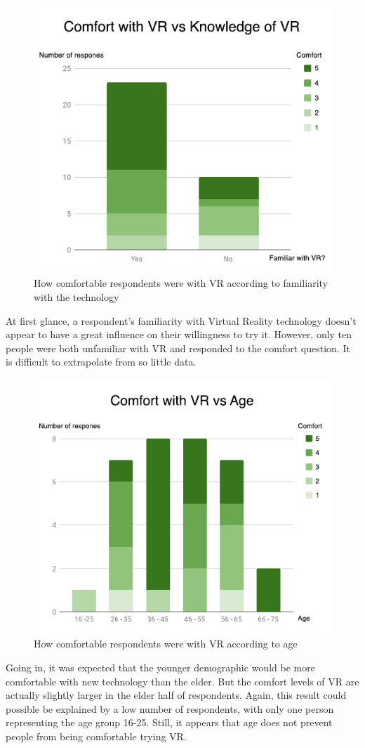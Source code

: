 			\begin{figure}[H]
				\centering
				\includegraphics[width=0.6\linewidth]{figure/Analysis/comfort.png}
				\caption{How comfortable respondents were with VR according to familiarity with the technology}
				\label{fig:comfort}
			\end{figure}
		
			At first glance, a respondent's familiarity with Virtual Reality technology doesn't appear to have a great influence on their willingness to try it. However, only ten people were both unfamiliar with VR and responded to the comfort question. It is difficult to extrapolate from so little data.
		
			\begin{figure}[H]
				\centering
				\includegraphics[width=0.6\linewidth]{figure/Analysis/vrcomfort.png}
				\caption{How comfortable respondents were with VR according to age}
				\label{fig:vrcomfort}
			\end{figure}
		
			Going in, it was expected that the younger demographic would be more comfortable with new technology than the elder. But the comfort levels of VR are actually slightly larger in the elder half of respondents. Again, this result could possible be explained by a low number of respondents, with only one person representing the age group 16-25. Still, it appears that age does not prevent people from being comfortable trying VR.
			
